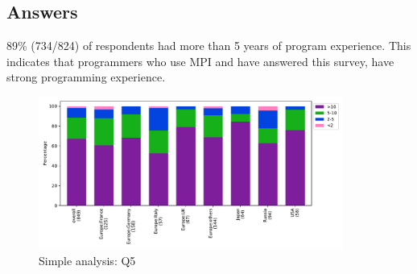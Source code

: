 
\subsection{Answers}


89\% (734/824) of respondents had more than 5 years of program experience. This
indicates that programmers who use MPI and have answered this survey, have strong
programming experience.

\begin{figure}[htb]
\begin{center}
\includegraphics[width=10cm]{../pdfs/Q5.pdf}
\caption{Simple analysis: Q5}
\label{fig:Q5}
\end{center}
\end{figure}
